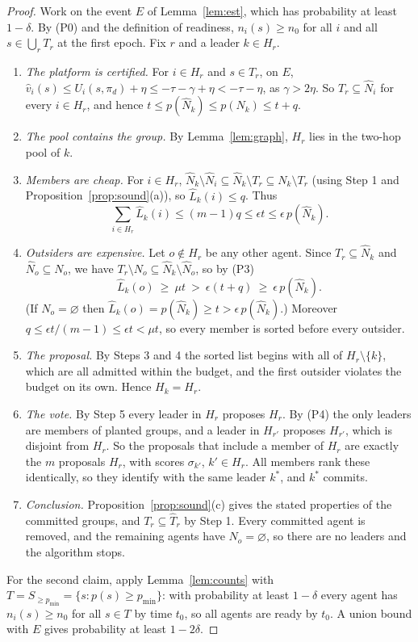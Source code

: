\documentclass[11pt]{article}
\theoremstyle{plain}
\theoremstyle{definition}
\theoremstyle{remark}
\begin{document}
\begin{proof}
Work on the event $E$ of Lemma~\ref{lem:est}, which has probability at least $1-\delta$. By (P0) and the definition of readiness, $n_i(s)\ge n_0$ for all $i$ and all $s\in\bigcup_rT_r$ at the first epoch.
Fix $r$ and a leader $k\in H_r$.
\begin{enumerate}[label=\textbf{Step \arabic*.},leftmargin=4.6em,itemsep=4pt]
    \item \emph{The platform is certified.} For $i\in H_r$ and $s\in T_r$, on $E$,
    $\hat v_i(s)\le U_i(s,\pi_d)+\eta\le-\tau-\gamma+\eta<-\tau-\eta$, as $\gamma>2\eta$. So $T_r\subseteq\hat N_i$ for every $i\in H_r$, and hence
    $t\le p(\hat N_k)\le p(N_k)\le t+q$.
    \item \emph{The pool contains the group.} By Lemma~\ref{lem:graph}, $H_r$ lies in the two-hop pool of $k$.
    \item \emph{Members are cheap.} For $i\in H_r$, $\hat N_k\setminus\hat N_i\subseteq\hat N_k\setminus T_r\subseteq N_k\setminus T_r$ (using Step 1 and Proposition~\ref{prop:sound}(a)), so $\hat L_k(i)\le q$. Thus
    \[ \sum_{i\in H_r}\hat L_k(i)\le(m-1)q\le\epsilon t\le\epsilon\,p(\hat N_k). \]
    \item \emph{Outsiders are expensive.} Let $o\notin H_r$ be any other agent. Since $T_r\subseteq\hat N_k$ and $\hat N_o\subseteq N_o$, we have $T_r\setminus N_o\subseteq\hat N_k\setminus\hat N_o$, so by (P3)
    \[ \hat L_k(o)\ \ge\ \mu t\ >\ \epsilon(t+q)\ \ge\ \epsilon\,p(\hat N_k). \]
    (If $N_o=\varnothing$ then $\hat L_k(o)=p(\hat N_k)\ge t>\epsilon\,p(\hat N_k)$.) Moreover $q\le\epsilon t/(m-1)\le\epsilon t<\mu t$, so every member is sorted before every outsider.
    \item \emph{The proposal.} By Steps 3 and 4 the sorted list begins with all of $H_r\setminus\{k\}$, which are all admitted within the budget, and the first outsider violates the budget on its own. Hence $H_k=H_r$.
    \item \emph{The vote.} By Step 5 every leader in $H_r$ proposes $H_r$. By (P4) the only leaders are members of planted groups, and a leader in $H_{r'}$ proposes $H_{r'}$, which is disjoint from $H_r$.
    So the proposals that include a member of $H_r$ are exactly the $m$ proposals $H_r$, with scores $\sigma_{k'}$, $k'\in H_r$. All members rank these identically, so they identify with the same leader $k^*$, and $k^*$ commits.
    \item \emph{Conclusion.} Proposition~\ref{prop:sound}(c) gives the stated properties of the committed groups, and $T_r\subseteq\hat T_r$ by Step 1. Every committed agent is removed, and the remaining agents have $N_o=\varnothing$, so there are no leaders and the algorithm stops.
\end{enumerate}
For the second claim, apply Lemma~\ref{lem:counts} with $T=S_{\ge p_{\min}}=\{s:p(s)\ge p_{\min}\}$: with probability at least $1-\delta$ every agent has $n_i(s)\ge n_0$ for all $s\in T$ by time $t_0$,
so all agents are ready by $t_0$. A union bound with $E$ gives probability at least $1-2\delta$.
\end{proof}
 
\end{document}
